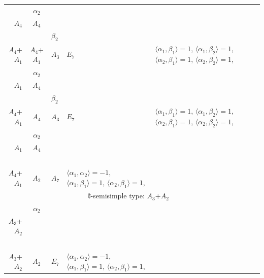 \documentclass[12pt]{report}
\begin{document}
\begin{appendix}
{\begin{longtable}{rcl p{1cm}p{1cm}p{3cm} }
\\
\begin{tabular}{cc}$\alpha_1$+ & $\alpha_2$\\\tiny{ $A_4$ } & \tiny{ $A_4$ }\end{tabular} &\begin{tabular}{c} = \\~ \end{tabular} & \begin{tabular}{cc}$\beta_1$+ & $\beta_2$\\\tiny{ $A_4$+$A_1$ } & \tiny{ $A_4$+$A_1$ }\end{tabular} & $A_3$ & $E_7$ &  $\langle\alpha_1, \beta_1\rangle=1$, $\langle\alpha_1, \beta_2\rangle=1$, $\langle\alpha_2, \beta_1\rangle=1$, $\langle\alpha_2, \beta_2\rangle=1$, 
\\
\begin{tabular}{cc}$\alpha_1$+ & $\alpha_2$\\\tiny{ $A_1$ } & \tiny{ $A_4$ }\end{tabular} &\begin{tabular}{c} = \\~ \end{tabular} & \begin{tabular}{cc}$\beta_1$+ & $\beta_2$\\\tiny{ $A_4$+$A_1$ } & \tiny{ $A_4$ }\end{tabular} & $A_3$ & $E_7$ &  $\langle\alpha_1, \beta_1\rangle=1$, $\langle\alpha_1, \beta_2\rangle=1$, $\langle\alpha_2, \beta_1\rangle=1$, $\langle\alpha_2, \beta_2\rangle=1$, 
\\
\begin{tabular}{cc}$\alpha_1$+ & $\alpha_2$\\\tiny{ $A_1$ } & \tiny{ $A_4$ }\end{tabular} &\begin{tabular}{c} = \\~ \end{tabular} & \begin{tabular}{c}$\beta_1$\\\tiny{ $A_4$+$A_1$ }\end{tabular} & $A_2$ & $A_7$ & $\langle\alpha_1, \alpha_2\rangle=-1$,  $\langle\alpha_1, \beta_1\rangle=1$, $\langle\alpha_2, \beta_1\rangle=1$, 
\\
\hline\multicolumn{5}{c}{$\mathfrak{k}$-semisimple type: $A_3$+$A_2$}\\
\hline\hline\begin{tabular}{cc}$\alpha_1$+ & $\alpha_2$\\\tiny{ $A_3$+$A_2$ } & \tiny{  }\end{tabular} &\begin{tabular}{c} = \\~ \end{tabular} & \begin{tabular}{c}$\beta_1$\\\tiny{ $A_3$+$A_2$ }\end{tabular} & $A_2$ & $E_7$ & $\langle\alpha_1, \alpha_2\rangle=-1$,  $\langle\alpha_1, \beta_1\rangle=1$, $\langle\alpha_2, \beta_1\rangle=1$, 

\end{longtable}}
\end{appendix}
\end{document}
